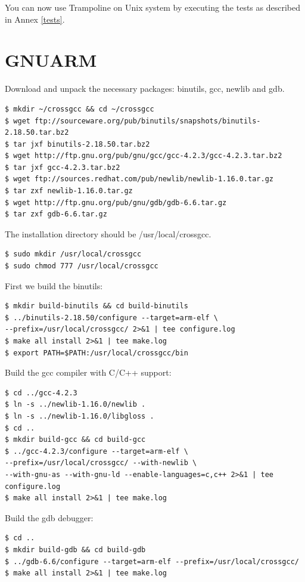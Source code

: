 \documentclass[10pt]{article}
\begin{document}
You can now use Trampoline on Unix system by executing the tests as described in Annex \ref{tests}.

\section{GNUARM}
Download and unpack the necessary packages: binutils, gcc, newlib and gdb.
\begin{verbatim}
$ mkdir ~/crossgcc && cd ~/crossgcc
$ wget ftp://sourceware.org/pub/binutils/snapshots/binutils-2.18.50.tar.bz2
$ tar jxf binutils-2.18.50.tar.bz2
$ wget http://ftp.gnu.org/pub/gnu/gcc/gcc-4.2.3/gcc-4.2.3.tar.bz2
$ tar jxf gcc-4.2.3.tar.bz2
$ wget ftp://sources.redhat.com/pub/newlib/newlib-1.16.0.tar.gz
$ tar zxf newlib-1.16.0.tar.gz
$ wget http://ftp.gnu.org/pub/gnu/gdb/gdb-6.6.tar.gz
$ tar zxf gdb-6.6.tar.gz
\end{verbatim}

The installation directory should be /usr/local/crossgcc.

\begin{verbatim}
$ sudo mkdir /usr/local/crossgcc
$ sudo chmod 777 /usr/local/crossgcc
\end{verbatim}

First we build the binutils:

\begin{verbatim}
$ mkdir build-binutils && cd build-binutils
$ ../binutils-2.18.50/configure --target=arm-elf \
--prefix=/usr/local/crossgcc/ 2>&1 | tee configure.log
$ make all install 2>&1 | tee make.log
$ export PATH=$PATH:/usr/local/crossgcc/bin
\end{verbatim}

Build the gcc compiler with C/C++ support:

\begin{verbatim}
$ cd ../gcc-4.2.3
$ ln -s ../newlib-1.16.0/newlib .
$ ln -s ../newlib-1.16.0/libgloss .
$ cd ..
$ mkdir build-gcc && cd build-gcc
$ ../gcc-4.2.3/configure --target=arm-elf \
--prefix=/usr/local/crossgcc/ --with-newlib \
--with-gnu-as --with-gnu-ld --enable-languages=c,c++ 2>&1 | tee configure.log
$ make all install 2>&1 | tee make.log
\end{verbatim}

Build the gdb debugger:

\begin{verbatim}
$ cd ..
$ mkdir build-gdb && cd build-gdb
$ ../gdb-6.6/configure --target=arm-elf --prefix=/usr/local/crossgcc/
$ make all install 2>&1 | tee make.log
\end{verbatim}
\end{document}
